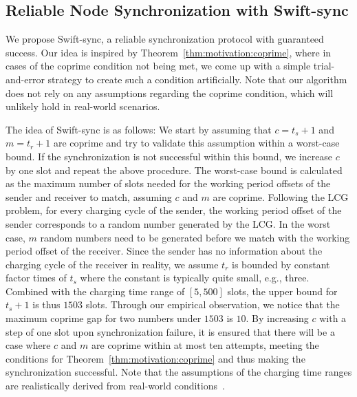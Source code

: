 \documentclass[lettersize,journal]{IEEEtran}
\newcommand{\sync}{Swift-sync\xspace}
\begin{document}
\subsection{Reliable Node Synchronization with \sync}
We propose \sync, a reliable synchronization protocol with guaranteed success. Our idea is inspired by Theorem~\ref{thm:motivation:coprime}, where in cases of the coprime condition not being met, we come up with a simple trial-and-error strategy to create such a condition artificially. Note that our algorithm does not rely on any assumptions regarding the coprime condition, which will unlikely hold in real-world scenarios. 

The idea of \sync is as follows: We start by assuming that $c = t_s+1$ and $m=t_r+1$ are coprime and try to validate this assumption within a worst-case bound. If the synchronization is not successful within this bound, we increase $c$ by one slot and repeat the above procedure. The worst-case bound is calculated as the maximum number of slots needed for the working period offsets of the sender and receiver to match, assuming $c$ and $m$ are coprime. Following the LCG problem, for every charging cycle of the sender, the working period offset of the sender corresponds to a random number generated by the LCG. In the worst case, $m$ random numbers need to be generated before we match with the working period offset of the receiver. Since the sender has no information about the charging cycle of the receiver in reality, we assume $t_r$ is bounded by constant factor times of $t_s$ where the constant is typically quite small, e.g., three. 
Combined with the charging time range of $[5,500]$ slots, the upper bound for $t_s+1$ is thus $1503$ slots. Through our empirical observation, we notice that the maximum coprime gap for two numbers under $1503$ is $10$.
By increasing $c$ with a step of one slot upon synchronization failure, it is ensured that there will be a case where $c$ and $m$ are coprime within at most ten attempts, meeting the conditions for Theorem~\ref{thm:motivation:coprime} and thus making the synchronization successful. Note that the assumptions of the charging time ranges are realistically derived from real-world conditions~\cite{2021-nsdi-find,2022-nsdi-bonito}.
\end{document}
